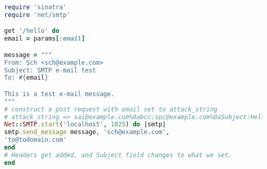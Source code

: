 \begin{lstlisting}[language=Ruby,caption={Ruby program with e-mail
      header injection vulnerability.},label={code:rubyemi}, float]
require 'sinatra'
require 'net/smtp'

get '/hello' do
email = params[:email]

message = """
From: Sch <sch@example.com>
Subject: SMTP e-mail test
To: #{email}

This is a test e-mail message.
"""
# construct a post request with email set to attack_string
# attack_string => sai@example.com%0abcc:spc@example.com%0aSubject:Hello
Net::SMTP.start('localhost', 1025) do |smtp|
smtp.send_message message, 'sch@example.com',
'to@todomain.com'
end
# Headers get added, and Subject field changes to what we set.
end
\end{lstlisting}
